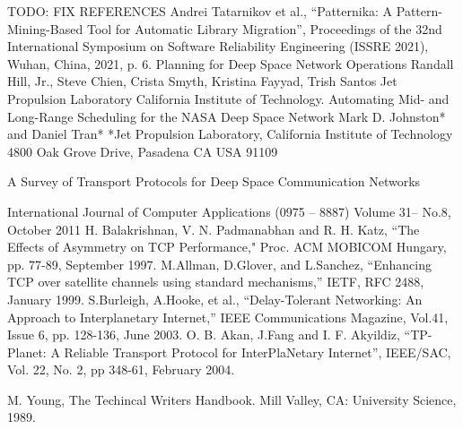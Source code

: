 \documentclass[letterpaper, 10 pt, conference]{ieeeconf}  %
\begin{document}
\addtolength{\textheight}{-12cm}   %










\begin{thebibliography}{99}
 TODO: FIX REFERENCES
 Andrei Tatarnikov et al., “Patternika: A
Pattern-Mining-Based Tool for Automatic Library Migration”,
Proceedings of the 32nd International Symposium on Software
Reliability Engineering (ISSRE 2021), Wuhan, China, 2021, p. 6.
 Planning for Deep Space Network Operations
Randall Hill, Jr., Steve Chien, Crista Smyth, Kristina Fayyad, Trish Santos
Jet Propulsion Laboratory
California Institute of Technology.
 Automating Mid- and Long-Range Scheduling for the NASA Deep Space Network
Mark D. Johnston* and Daniel Tran*
*Jet Propulsion Laboratory, California Institute of Technology
4800 Oak Grove Drive, Pasadena CA USA 91109

 A Survey of Transport Protocols for Deep Space
Communication Networks

International Journal of Computer Applications (0975 – 8887)
Volume 31– No.8, October 2011
 H. Balakrishnan, V. N. Padmanabhan and R. H. Katz, “The Effects of Asymmetry on TCP Performance," Proc. ACM MOBICOM Hungary, pp. 77-89, September 1997.
 M.Allman, D.Glover, and L.Sanchez, “Enhancing TCP over satellite channels using standard mechanisms,” IETF, RFC 2488, January 1999.
S.Burleigh, A.Hooke, et al., “Delay-Tolerant Networking: An Approach to Interplanetary Internet,” IEEE Communications Magazine, Vol.41, Issue 6, pp. 128-136, June 2003.
 O. B. Akan, J.Fang and I. F. Akyildiz, “TP-Planet: A Reliable Transport Protocol for InterPlaNetary Internet”, IEEE/SAC, Vol. 22, No. 2, pp 348-61, February 2004.


  M. Young, The Techincal Writers Handbook. Mill Valley, CA: University
Science, 1989.



\end{thebibliography}
\end{document}
